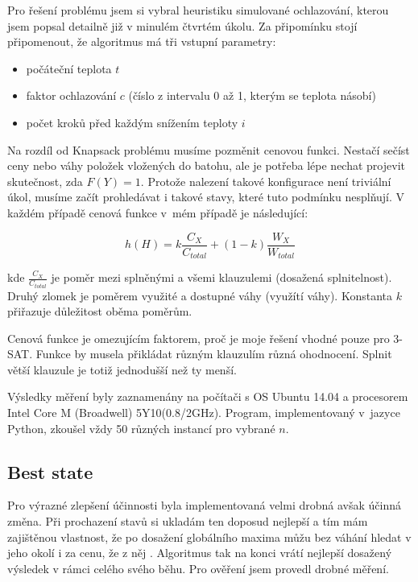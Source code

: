\documentclass[a4paper,10pt]{article}
\begin{document}
Pro řešení problému jsem si vybral heuristiku simulované ochlazování, kterou
jsem popsal detailně již v minulém čtvrtém úkolu.
Za připomínku stojí připomenout, že algoritmus má tři vstupní parametry:

\begin{itemize}
  \item počáteční teplota $t$
  \item faktor ochlazování $c$ (číslo z intervalu 0 až 1, kterým se teplota násobí)
  \item počet kroků před každým snížením teploty $i$
\end{itemize}

Na rozdíl od Knapsack problému musíme pozměnit cenovou funkci. Nestačí sečíst ceny nebo váhy položek vložených do batohu, ale je
potřeba lépe nechat projevit skutečnost, zda $F(Y)=1$. Protože nalezení takové
konfigurace není triviální úkol, musíme začít prohledávat i takové stavy, které tuto
podmínku nesplňují. V každém případě cenová funkce v~mém případě je následující:

$$h(H)= k\frac{C_X}{C_{total}} + (1-k)\frac{W_X}{W_{total}}$$

kde $\frac{C_X}{C_{total}}$ je poměr mezi splněnými a všemi klauzulemi (dosažená splnitelnost). Druhý zlomek je
poměrem využité a dostupné váhy (využítí váhy). Konstanta $k$ přiřazuje důležitost oběma poměrům.

Cenová funkce je omezujícím faktorem, proč je moje řešení vhodné pouze pro 3-SAT. Funkce by musela
přikládat různým klauzulím různá ohodnocení. Splnit větší klauzule je totiž jednodušší než ty menší.

Výsledky měření byly zaznamenány na počítači s OS Ubuntu 14.04 a procesorem Intel Core M (Broadwell) 5Y10(0.8/2GHz).
Program, implementovaný v~jazyce Python, zkoušel vždy 50 různých instancí pro vybrané $n$.

\subsection*{Best state}

Pro výrazné zlepšení účinnosti byla implementovaná velmi drobná avšak účinná změna.
Při prochazení stavů si ukladám ten doposud nejlepší a tím mám zajištěnou vlastnost, že po dosažení globálního maxima
můžu bez váhání hledat v jeho okolí i za cenu, že z něj . Algoritmus tak na konci vrátí nejlepší dosažený
výsledek v rámci celého svého běhu. Pro ověření jsem provedl drobné měření.
\end{document}
